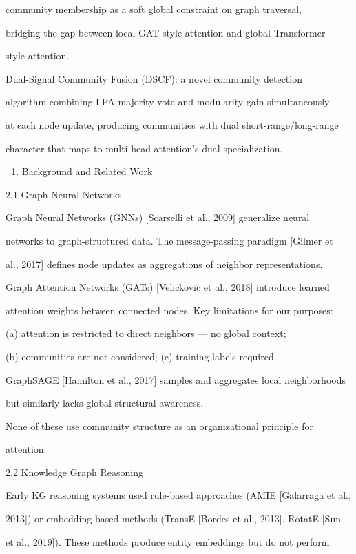 \documentclass[10pt,journal,compsoc]{IEEEtran}
\begin{document}
community membership as a soft global constraint on graph traversal,

bridging the gap between local GAT-style attention and global Transformer-

style attention.

Dual-Signal Community Fusion (DSCF): a novel community detection

algorithm combining LPA majority-vote and modularity gain simul\-taneously

at each node update, producing communities with dual short-range/long-range

character that maps to multi-head attention's dual speci\-alization.

\begin{enumerate}
\item Background and Related Work

\end{enumerate}
2.1 Graph Neural Networks

Graph Neural Networks (GNNs) [Scarselli et al., 2009] generalize neural

networks to graph-structured data. The message-passing paradigm [Gilmer et

al., 2017] defines node updates as aggre\-gations of neighbor repre\-sentations.

Graph Attention Networks (GATs) [Velickovic et al., 2018] introduce learned

attention weights between connected nodes. Key limitations for our purposes:

(a) attention is restricted to direct neighbors — no global context;

(b) communities are not considered; (c) training labels required.

GraphSAGE [Hamilton et al., 2017] samples and aggregates local neigh\-borhoods

but similarly lacks global structural awareness.

None of these use community structure as an organ\-izational principle for

attention.

2.2 Knowledge Graph Reasoning

Early KG reasoning systems used rule-based approaches (AMIE [Galarraga et al.,

2013]) or embedding-based methods (TransE [Bordes et al., 2013], RotatE [Sun

et al., 2019]). These methods produce entity embeddings but do not perform
\end{document}
